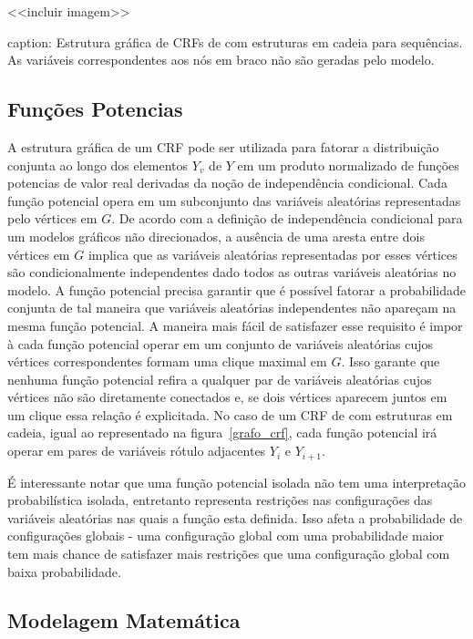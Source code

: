 <<incluir imagem>>

caption: Estrutura gráfica de CRFs de com estruturas em cadeia para sequências.
As variáveis correspondentes aos nós em braco não são geradas pelo modelo.

\subsection{Funções Potencias}

A estrutura gráfica de um CRF pode ser utilizada para fatorar a distribuição conjunta
ao longo dos elementos $Y_v$ de $Y$ em um produto normalizado de funções potencias de
valor real derivadas da noção de independência condicional. Cada função potencial
opera em um subconjunto das variáveis aleatórias representadas pelo vértices em $G$.
De acordo com a definição de independência condicional para um modelos gráficos não
direcionados, a ausência de uma aresta entre dois vértices em $G$ implica que as variáveis
aleatórias representadas por esses vértices são condicionalmente independentes dado todos
as outras variáveis aleatórias no modelo. A função potencial precisa garantir que é
possível fatorar a probabilidade conjunta de tal maneira que variáveis aleatórias
independentes não apareçam na mesma função potencial. A maneira mais fácil de satisfazer
esse requisito é impor à cada função potencial operar em um conjunto de variáveis aleatórias
cujos vértices correspondentes formam uma clique maximal em $G$. Isso garante que nenhuma
função potencial refira a qualquer par de variáveis aleatórias cujos vértices não são
diretamente conectados e, se dois vértices aparecem juntos em um clique essa relação é
explicitada. No caso de um CRF de com estruturas em cadeia, igual ao representado na
figura~\ref{grafo_crf}, cada função potencial irá operar em pares de variáveis rótulo adjacentes
$Y_i$ e $Y_{i+1}$.

É interessante notar que uma função potencial isolada não tem uma interpretação probabilística
isolada, entretanto representa restrições nas configurações das variáveis aleatórias nas quais
a função esta definida. Isso afeta a probabilidade de configurações globais - uma configuração
global com uma probabilidade maior tem mais chance de satisfazer mais restrições que uma
configuração global com baixa probabilidade.

\subsection{Modelagem Matemática}


